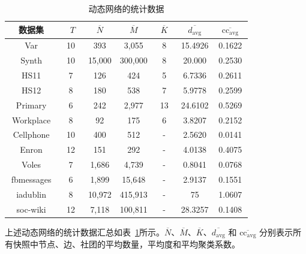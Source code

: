 \begin{table}[htbp]
	\caption{动态网络的统计数据}\label{tab1}
	\vspace{0.5em}\centering\wuhao
	\centering%
	\renewcommand\arraystretch{1}{
		\begin{tabular}{ccccccc}
			\toprule
			\centering
			~~数据集~~ & ~ $T$~ &~  $\overline{N}$ ~& ~$\overline{M}$~ & ~$\overline{K}$~ & ~$\overline{d_{\mathrm{avg}}}$~ & ~$\overline{\mathrm{cc}_{\mathrm{avg}}}$~\\
			\hline
			Var &  10 & 393 & 3,055 & 8 & 15.4926 & 0.1622\\ 
			
			Synth &  10 & 15,000 & 300,000 & 8 & 20.000 & 0.2530\\ 
			
			HS11 &  7 & 126 & 424 & 5 & 6.7336 & 0.2611\\
			
			HS12 &  8 & 180 & 538 & 7 & 5.9778 & 0.2599\\
			
			Primary &  6 & 242 & 2,977 & 13 & 24.6102 & 0.5269\\
			
			Workplace &  8 & 92 & 175 & 6 & 3.8207 & 0.2152\\
			
			Cellphone &  10 & 400 & 512 & - & 2.5620 & 0.0141\\
			
			Enron &  12 & 151 & 292 & - & 4.0138 & 0.4075\\
			
			Voles &  7 & 1,686 & 4,739 & - & 0.8041 & 0.0768\\
			
			fbmessages &  6 & 1,899 & 15,648 & - & 2.9137 & 0.1551\\
			
			iadublin & 8 & 10,972 & 415,913 & - & 75 & 1.0607\\
			
			soc-wiki & 12 & 7,118 & 100,811 & - & 28.3257 & 0.1408 \\
			\bottomrule
	\end{tabular}} 
	\vspace{0cm}
\end{table}


上述动态网络的统计数据汇总如表~\ref{tab1}所示。$\overline{N}$、$\overline{M}$、$\overline{K}$、$\overline{d_{\mathrm{avg}}}$ 和 $\overline{\mathrm{cc}_{\mathrm{avg}}}$ 分别表示所有快照中节点、边、社团的平均数量，平均度和平均聚类系数。







